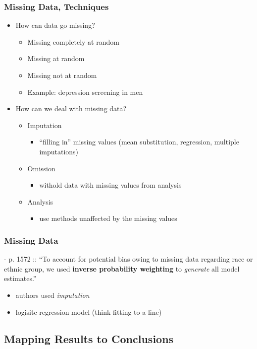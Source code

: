 \documentclass{beamer}
\begin{document}
			\begin{frame}
				\frametitle{Missing Data, Techniques}
				\begin{itemize}
					\item How can data go missing?
						\begin{itemize}
							\item Missing completely at random
							\item Missing at random
							\item Missing not at random
							\item Example: depression screening in men
						\end{itemize}
					\pause
					\item How can we deal with missing data?
						\begin{itemize}
							\item Imputation
								\begin{itemize}
									\item ``filling in'' missing values (mean substitution, regression, multiple imputations)
								\end{itemize}
							\item Omission
								\begin{itemize}
									\item withold data with missing values from analysis
								\end{itemize}
							\item Analysis
								\begin{itemize}
									\item use methods unaffected by the missing values
								\end{itemize}
						\end{itemize}
				\end{itemize}	
			\end{frame}
			\begin{frame}
				\frametitle{Missing Data}
				- p. 1572 :: ``To account for potential bias owing to missing data regarding race or ethnic group, we used \textbf{inverse probability weighting }to \textit{generate} all model estimates.''
				\pause
				\begin{itemize}
					\item authors used \textit{imputation}
					\item logisitc regression model (think fitting to a line)
				\end{itemize}
			\end{frame}
	\subsection{Mapping Results to Conclusions}
\end{document}
